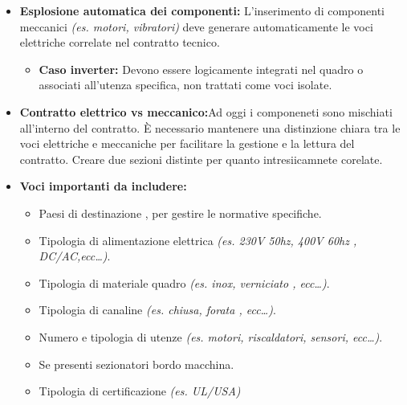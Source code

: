 \documentclass[12pt, a4paper]{article} %
\begin{document}
\begin{itemize}
      \item \textbf{Esplosione automatica dei componenti:}
            L'inserimento di componenti meccanici \textit{(es. motori, vibratori)} deve generare automaticamente le voci elettriche correlate nel contratto tecnico.
            \begin{itemize}
                  \item \textbf{Caso inverter:} Devono essere logicamente integrati nel quadro o associati all'utenza specifica, non trattati come voci isolate.
            \end{itemize}
      \item \textbf{Contratto elettrico vs meccanico:}Ad oggi i componeneti sono mischiati all'interno del contratto.
            È necessario mantenere una distinzione chiara tra le voci elettriche e meccaniche per facilitare la gestione e la lettura del contratto.
            Creare due sezioni distinte per quanto intresiicamnete corelate.
      \item \textbf{Voci importanti da includere:}
            \begin{itemize}
                  \item Paesi di destinazione , per gestire le normative specifiche.
                  \item Tipologia di alimentazione elettrica \textit{(es. 230V 50hz, 400V 60hz ,
                              DC/AC,ecc\dots)}.
                  \item Tipologia di materiale quadro \textit{(es. inox, verniciato , ecc\dots)}.
                  \item Tipologia di canaline \textit{(es. chiusa, forata , ecc\dots)}.
                  \item Numero e tipologia di utenze \textit{(es. motori, riscaldatori, sensori,
                              ecc\dots)}.
                  \item Se presenti sezionatori bordo macchina.
                  \item Tipologia di certificazione \textit{(es. UL/USA)}
            \end{itemize}
\end{itemize}
\end{document}
